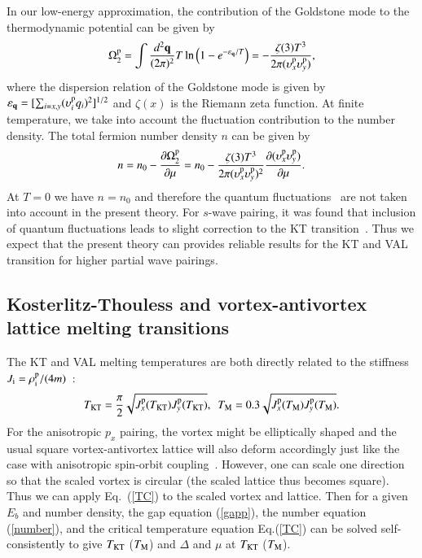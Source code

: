\documentclass[aps,prd,amsmath,two column,nofootinbib,amssymb,referee]{revtex4}
\begin{document}
In our low-energy approximation, the contribution of the Goldstone mode to the thermodynamic potential can be given by
\begin{eqnarray}
\Omega_2^{\rm p}=\int{d^2{\bf q}\over(2\pi)^2}T\ln\Big(1-e^{-\varepsilon_{\bf q}/T}\Big)=-{\zeta(3)T^3\over2\pi(\upsilon_x^{\rm p}\upsilon_y^{\rm p})},
\end{eqnarray}
where the dispersion relation of the Goldstone mode is given by $\varepsilon_{\bf q}=[\sum_{i=x,y}(\upsilon_i^{\rm p}q_i)^2]^{1/2}$ and $\zeta(x)$ is the Riemann zeta function. At finite temperature, we take into account 
the fluctuation contribution to the  number density. The total fermion number density $n$ can be given by
\begin{eqnarray}\label{number}
n=n_0-\frac{\partial \Omega_2^{\rm p}}{\partial\mu}=n_0-{\zeta(3)T^3\over2\pi(\upsilon_x^{\rm p}\upsilon_y^{\rm p})^2}{\partial(\upsilon_x^{\rm p}\upsilon_y^{\rm p})\over\partial\mu}.
\end{eqnarray}
At $T=0$ we have $n=n_0$ and therefore the quantum fluctuations~\cite{GPF01,GPF02,GPF03} are not taken into account in the present theory. For $s$-wave pairing, it was found that inclusion of quantum fluctuations
leads to slight correction to the KT transition~\cite{GPF04,GPF05}. Thus we expect that the present theory can provides reliable results for the KT and VAL transition for higher partial wave pairings.



\subsection{Kosterlitz-Thouless and vortex-antivortex lattice melting transitions}\label{sectionpB}
The KT and VAL melting temperatures are both directly related to the stiffness $J_{\rm i}=\rho_{\rm i}^{\rm p}/(4m)$~\cite{BKT,Nelson1979,Young,Botelho2006}:
\begin{eqnarray}\label{TC}
T_{\rm KT}={\pi\over2}\sqrt{J_{x}^{\rm p}(T_{\rm KT})J_{y}^{\rm p}(T_{\rm KT})},\ \ T_{\rm M}=0.3\sqrt{J_{x}^{\rm p}(T_{\rm M})J_{y}^{\rm p}(T_{\rm M})}.
\end{eqnarray}
For the anisotropic $p_x$ pairing, the vortex might be elliptically shaped and the usual square vortex-antivortex lattice will also deform accordingly just like the case with anisotropic spin-orbit coupling~\cite{BKT-SOC02}. However, one can scale one direction so that the scaled vortex is circular (the scaled lattice thus becomes square). Thus we can apply Eq.~(\ref{TC}) to the scaled vortex and lattice. Then for a given $E_b$ and number density, the gap equation (\ref{gapp}), the number equation (\ref{number}), and the critical temperature equation Eq.(\ref{TC}) can be solved self-consistently to give $T_{\rm KT}$ ($T_{\rm M}$) and $\Delta$ and $\mu$ at $T_{\rm KT}$ ($T_{\rm M}$). 
\end{document}
